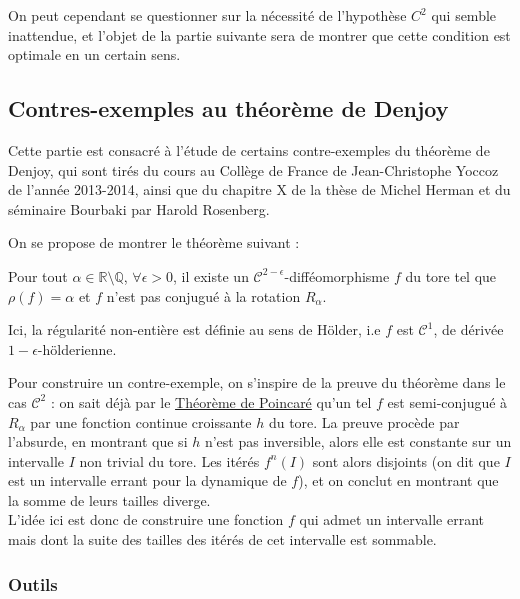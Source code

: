 \documentclass[11pt,a4paper]{article}
\begin{document}
On peut cependant se questionner sur la nécessité de l'hypothèse $C^2$ qui semble inattendue, et l'objet de la partie suivante sera de montrer que cette condition est optimale en un certain sens.


\subsection{Contres-exemples au théorème de Denjoy}
Cette partie est consacré à l'étude de certains contre-exemples du théorème de Denjoy, qui sont tirés du cours au Collège de France de Jean-Christophe Yoccoz de l'année 2013-2014, ainsi que du chapitre X de la thèse de Michel Herman \cite{herman} et du séminaire Bourbaki \cite{rosenberg} par Harold Rosenberg.

On se propose de montrer le théorème suivant :

\begin{thm}[Denjoy]\label{cex_denjoy}
Pour tout $\alpha \in \mathbb{R} \setminus \mathbb{Q}$, $\forall \epsilon > 0$, il existe un $\mathcal{C}^{2-\epsilon}$-difféomorphisme $f$ du tore tel que $\rho(f)=\alpha$ et $f$ n'est pas conjugué à la rotation $R_\alpha$.
\end{thm}

\begin{rmq}
Ici, la  régularité non-entière est définie au sens de Hölder, i.e $f$ est $\mathcal{C}^1$, de dérivée $1-\epsilon$-hölderienne.
\end{rmq}

Pour construire un contre-exemple, on s'inspire de la preuve du théorème dans le cas $\mathcal{C}^2$ : on sait déjà par le \hyperref[poincare]{Théorème de Poincaré} qu'un tel $f$ est semi-conjugué à $R_\alpha$ par une fonction continue croissante $h$ du tore. La preuve procède par l'absurde, en montrant que si $h$ n'est pas inversible, alors elle est constante sur un intervalle $I$ non trivial du tore. Les itérés $f^n(I)$ sont alors disjoints (on dit que $I$ est un intervalle errant pour la dynamique de $f$), et on conclut en montrant que la somme de leurs tailles diverge. \\ 
L'idée ici est donc de construire une fonction $f$ qui admet un intervalle errant mais dont la suite des tailles des itérés de cet intervalle est sommable. 

\subsubsection{Outils}
\end{document}

